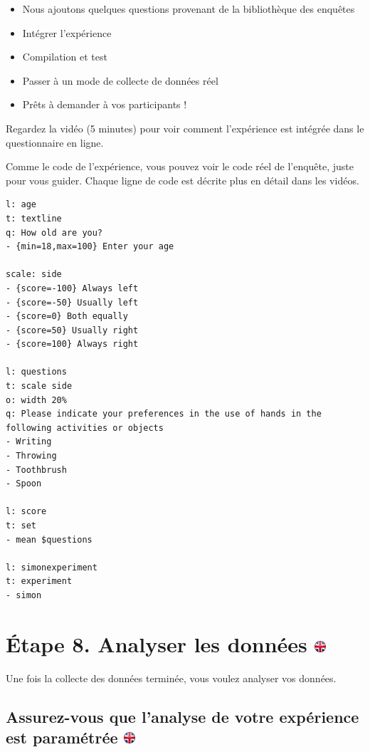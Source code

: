 \documentclass[
]{book}
\providecommand{\tightlist}{%
  \setlength{\itemsep}{0pt}\setlength{\parskip}{0pt}}
\begin{document}
\begin{itemize}
\tightlist
\item
  Nous ajoutons quelques questions provenant de la bibliothèque des
  enquêtes
\item
  Intégrer l'expérience
\item
  Compilation et test
\item
  Passer à un mode de collecte de données réel
\item
  Prêts à demander à vos participants !
\end{itemize}

Regardez la vidéo (5 minutes) pour voir comment l'expérience est
intégrée dans le questionnaire en ligne.

Comme le code de l'expérience, vous pouvez voir le code réel de
l'enquête, juste pour vous guider. Chaque ligne de code est décrite plus
en détail dans les vidéos.

\begin{verbatim}
l: age
t: textline
q: How old are you?
- {min=18,max=100} Enter your age

scale: side
- {score=-100} Always left
- {score=-50} Usually left
- {score=0} Both equally
- {score=50} Usually right
- {score=100} Always right

l: questions
t: scale side
o: width 20%
q: Please indicate your preferences in the use of hands in the following activities or objects
- Writing
- Throwing
- Toothbrush
- Spoon

l: score
t: set
- mean $questions

l: simonexperiment
t: experiment
- simon
\end{verbatim}

\hypertarget{uxe9tape-8.-analyser-les-donnuxe9es}{%
\section[Étape 8. Analyser les données ]{\texorpdfstring{Étape 8.
Analyser les données
\href{https://www.psytoolkit.org/lessons/project.html\#_step_8_analyze_data}{\protect\includegraphics{img/ukflag.png}}}{Étape 8. Analyser les données }}\label{uxe9tape-8.-analyser-les-donnuxe9es}}

Une fois la collecte des données terminée, vous voulez analyser vos
données.

\hypertarget{assurez-vous-que-lanalyse-de-votre-expuxe9rience-est-paramuxe9truxe9e}{%
\subsection[Assurez-vous que l'analyse de votre expérience est
paramétrée ]{\texorpdfstring{Assurez-vous que l'analyse de votre
expérience est paramétrée
\href{https://www.psytoolkit.org/lessons/project.html\#_make_sure_your_experiment_analysis_is_set}{\protect\includegraphics{img/ukflag.png}}}{Assurez-vous que l'analyse de votre expérience est paramétrée }}\label{assurez-vous-que-lanalyse-de-votre-expuxe9rience-est-paramuxe9truxe9e}}
\end{document}
